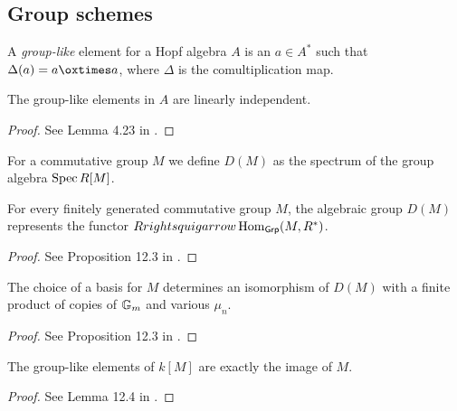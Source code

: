 \subsection{Group schemes}

\begin{definition}
  \label{grp_like}
  A \emph{group-like} element for a Hopf algebra $A$ is
  an $a\in A^*$ such that $\Delta(a) = a \ox a$, where $\Delta$ is the comultiplication map.
\end{definition}

\begin{lemma}
  \label{grp_like_li}
  The group-like elements in $A$ are linearly independent.
\end{lemma}
\begin{proof}
  See Lemma 4.23 in \cite{Milne_2017}.
\end{proof}

\begin{definition}
  \label{grp_alg_sch}
  For a commutative group $M$ we define $D(M)$ as the spectrum of the group algebra $\operatorname{Spec} R[M]$.
\end{definition}

\begin{proposition}
  \label{DM_func}
  For every finitely generated commutative group $M$, the algebraic group $D(M)$
  represents the functor $R rightsquigarrow \operatorname{Hom}_{\mathsf{Grp}}(M,R^*)$.
\end{proposition}
\begin{proof}
  See Proposition 12.3 in \cite{Milne_2017}.
\end{proof}

\begin{proposition}
  \label{DM_struct}
  The choice of a basis for $M$ determines an isomorphism of $D(M)$
  with a finite product of copies of ${\mathbb G_m}$ and various $\mu_n$.
\end{proposition}
\begin{proof}
  See Proposition 12.3 in \cite{Milne_2017}.
\end{proof}

\begin{lemma}
  \label{grp_like_in_kM}
  The group-like elements of $k[M]$ are exactly the image of $M$.
\end{lemma}
\begin{proof}
  See Lemma 12.4 in \cite{Milne}.
\end{proof}

